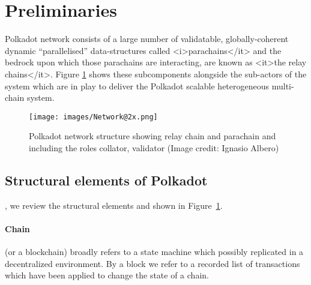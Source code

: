 \section{Preliminaries}\label{sec:preliminiary}


Polkadot network consists of a large number of validatable, globally-coherent dynamic “parallelised” data-structures called  <i>parachains</it> and the bedrock upon which those parachains are interacting, are known as <it>the relay chains</it>. Figure \ref{fig:roles} shows these subcomponents alongside the sub-actors of the system which are in play to deliver the Polkadot scalable heterogeneous multi-chain system.

\begin{figure}[h]
	\centering
	\texttt{[image: images/Network@2x.png]}
	\caption{Polkadot network structure showing relay chain and parachain and including the roles collator, validator (Image credit: Ignasio Albero)}
	\label{fig:roles}
\end{figure}
\subsection{Structural elements of Polkadot}
, we review the structural elements and  shown in Figure~\ref{fig:roles}.


\paragraph{Chain} (or a blockchain) broadly refers to a state machine which possibly replicated in a decentralized environment. By a block we refer to a recorded list of transactions which have been applied to change the state of a chain.

